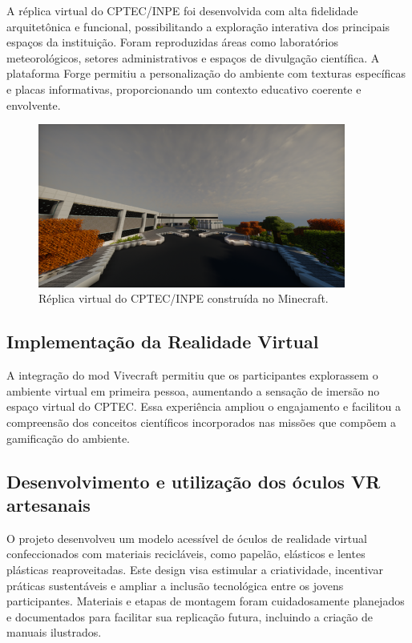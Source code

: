 A réplica virtual do CPTEC/INPE foi desenvolvida com alta fidelidade arquitetônica e funcional, possibilitando a exploração interativa dos principais espaços da instituição. Foram reproduzidas áreas como laboratórios meteorológicos, setores administrativos e espaços de divulgação científica. A plataforma Forge permitiu a personalização do ambiente com texturas específicas e placas informativas, proporcionando um contexto educativo coerente e envolvente.

\begin{figure}[H]
    \centering
    \includegraphics[width=0.9\textwidth]{docs/figuras/Imagem1.png}
    \caption{Réplica virtual do CPTEC/INPE construída no Minecraft.}
    \label{fig:replica_cptec}
\end{figure}

\subsection{Implementação da Realidade Virtual}

A integração do mod Vivecraft permitiu que os participantes explorassem o ambiente virtual em primeira pessoa, aumentando a sensação de imersão no espaço virtual do CPTEC. Essa experiência ampliou o engajamento e facilitou a compreensão dos conceitos científicos incorporados nas missões que compõem a gamificação do ambiente.

\subsection{Desenvolvimento e utilização dos óculos VR artesanais}

O projeto desenvolveu um modelo acessível de óculos de realidade virtual confeccionados com materiais recicláveis, como papelão, elásticos e lentes plásticas reaproveitadas. Este design visa estimular a criatividade, incentivar práticas sustentáveis e ampliar a inclusão tecnológica entre os jovens participantes. Materiais e etapas de montagem foram cuidadosamente planejados e documentados para facilitar sua replicação futura, incluindo a criação de manuais ilustrados.


